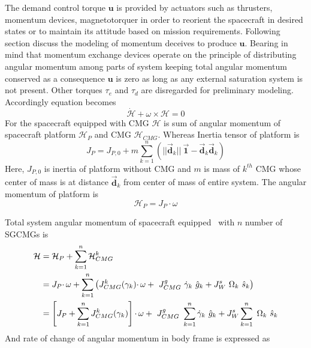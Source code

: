 \noindent The demand control torque $\displaystyle \mathbf{u}$ is provided by actuators such as thrusters, momentum devices, magnetotorquer in order to reorient the spacecraft in desired states or to maintain its attitude based on mission requirements. Following section discuss the modeling of momentum deceives to produce $\displaystyle \mathbf{u}$. Bearing in mind that momentum exchange devices operate on the principle of distributing angular momentum among parts of system keeping total angular momentum conserved as a consequence $\displaystyle \mathbf{u}$ is zero as long as any external saturation system is not present. Other torques $\displaystyle \tau _{e}$ and $\displaystyle \tau _{d}$ are disregarded for preliminary modeling. Accordingly equation becomes
\begin{equation}
\dot{\mathcal{H}} +\omega \times \mathcal{H} = 0
\label{eqn:TorqueFreeEOM}
\end{equation}
For the spacecraft equipped with CMG $\displaystyle \mathcal{H}$ is sum of angular momentum of spacecraft platform $\displaystyle \mathcal{H}_{P}$ and CMG $\displaystyle \mathcal{H}_{CMG}$. Whereas Inertia tensor of platform is
\begin{equation}
J_{P} =J_{P,0} +m\sum ^{n}_{k=1}( ||\vec{\mathbf{d}}_{k} ||\ \vec{\mathbf{1}} -\vec{\mathbf{d}}_{k}\vec{\mathbf{d}}_{k})
\end{equation}
Here, $\displaystyle J_{P,0}$ is inertia of platform without CMG and $\displaystyle m$ is mass of $\displaystyle k^{th}$ CMG whose center of mass is at distance $\displaystyle \vec{\mathbf{d}}_{k}$ from center of mass of entire system. The angular momentum of platform is
\begin{equation}
\mathcal{H}_{P} =J_{P} \cdotp \omega 
\end{equation}

Total system angular momentum of spacecraft equipped \ with $\displaystyle n$ number of SGCMGs is 
\begin{equation}
    \begin{aligned}
\mathcal{H} & =\mathcal{H}_{P} +\sum ^{n}_{k=1}\mathcal{H}^{k}_{CMG}\\
 & =J_{P} \cdotp \omega +\sum ^{n}_{k=1}\left( J^{k}_{CMG}( \gamma _{k}) \cdotp \omega +\ J^{g}_{CMG} \ \dot{\gamma }_{k} \ \hat{g}_{k} +J^{s}_{W} \ \Omega _{k} \ \hat{s}_{k}\right)\\
 & =\left[ J_{P} +\sum ^{n}_{k=1} J^{k}_{CMG}( \gamma _{k})\right] \cdotp \omega +\ J^{g}_{CMG} \ \sum ^{n}_{k=1}\dot{\gamma }_{k} \ \hat{g}_{k} +J^{s}_{W}\sum ^{n}_{k=1} \ \Omega _{k} \ \hat{s}_{k}
\end{aligned}\\
\label{eqn:H_Total}
\end{equation}
And rate of change of angular momentum in body frame is expressed as

